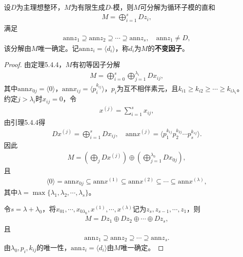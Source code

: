 \documentclass[../../main.tex]{subfiles}%
\begin{document}
\begin{theorem}
设$D$为主理想整环，$M$为有限生成$D$-模，则$M$可分解为循环子模的直和
\begin{align*}
M=\bigoplus\limits_{i=1}^{s}Dz_i,
\end{align*}
满足
\begin{align*}
\mathrm{ann}z_1\supseteq\mathrm{ann}z_2\supseteq\cdots\supseteq\mathrm{ann}z_s,\quad \mathrm{ann}z_1\neq D,
\end{align*}
该分解由$M$唯一确定。记$\mathrm{ann}z_i=\langle d_i\rangle$，称$d_i$为$M$的\textbf{不变因子}。
\end{theorem}
\begin{proof}

由定理5.4.4，$M$有初等因子分解
\begin{align*}
M=\bigoplus\limits_{i=0}^{s}\bigoplus\limits_{j=1}^{\lambda_i}Dx_{ij},
\end{align*}
其中$\mathrm{ann}x_{0j}=\langle0\rangle$，$\mathrm{ann}x_{ij}=\langle p_i^{k_{ij}}\rangle$，$p_i$为互不相伴素元，且$k_{i1}\geqslant k_{i2}\geqslant\cdots\geqslant k_{i\lambda_i}$。
约定$j>\lambda_i$时$x_{ij}=0$，令
\begin{align*}
x^{(j)}=\sum\limits_{i=1}^{s}x_{ij},
\end{align*}
由引理5.4.4得
\begin{align*}
Dx^{(j)}=\bigoplus\limits_{i=1}^{s}Dx_{ij},\quad \mathrm{ann}x^{(j)}=\langle p_1^{k_{1j}}p_2^{k_{2j}}\cdots p_s^{k_{sj}}\rangle.
\end{align*}
因此
\begin{align*}
M=\left(\bigoplus\limits_{j}Dx^{(j)}\right)\oplus\left(\bigoplus\limits_{j=1}^{\lambda_0}Dx_{0j}\right),
\end{align*}
且
\begin{align*}
\langle0\rangle=\mathrm{ann}x_{0j}\subseteq\mathrm{ann}x^{(1)}\subseteq\mathrm{ann}x^{(2)}\subseteq\cdots\subseteq\mathrm{ann}x^{(\lambda)},
\end{align*}
其中$\lambda=\max\{\lambda_1,\lambda_2,\cdots,\lambda_s\}$。

令$s=\lambda+\lambda_0$，将$x_{01},\cdots,x_{0\lambda_0},x^{(1)},\cdots,x^{(\lambda)}$记为$z_s,z_{s-1},\cdots,z_1$，则
\begin{align*}
M=Dz_1\oplus Dz_2\oplus\cdots\oplus Dz_s,
\end{align*}
且
\begin{align*}
\mathrm{ann}z_1\supseteq\mathrm{ann}z_2\supseteq\cdots\supseteq\mathrm{ann}z_s.
\end{align*}
由$\lambda_0,p_i,k_{ij}$的唯一性，$\mathrm{ann}z_i=\langle d_i\rangle$由$M$唯一确定。

\end{proof}
\end{document}
